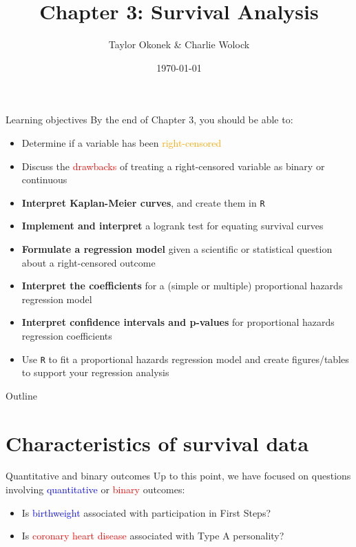 \documentclass[10pt,t]{beamer}
\title{Chapter 3: Survival Analysis}
\author{Taylor Okonek \& Charlie Wolock}
\date{\today}
\begin{document}
\begin{frame}
	\titlepage 
\end{frame}

\begin{frame}{Learning objectives}
	By the end of Chapter 3, you should be able to:
	
	\begin{itemize}
		\item Determine if a variable has been \textcolor{orange}{right-censored}
		\item Discuss the \textcolor{red}{drawbacks} of treating a right-censored variable as binary or continuous
		\item \textbf{Interpret Kaplan-Meier curves}, and create them in \texttt{R}
		\item \textbf{Implement and interpret} a logrank test for equating survival curves
		\item \textbf{Formulate a regression model} given a scientific or statistical question about a right-censored outcome
		\item \textbf{Interpret the coefficients} for a (simple or multiple) proportional hazards regression model
		\item \textbf{Interpret confidence intervals and p-values} for proportional hazards regression coefficients
		\item Use \texttt{R} to fit a proportional hazards regression model and create figures/tables to support your regression analysis
	\end{itemize}
	
\end{frame}

\begin{frame}{Outline}
	\tableofcontents
\end{frame}



\section{Characteristics of survival data}

\begin{frame}{Quantitative and binary outcomes}
Up to this point, we have focused on questions involving \textcolor{blue}{quantitative} or \textcolor{red}{binary} outcomes: 
\begin{itemize}
\item Is \textcolor{blue}{birthweight} associated with participation in First Steps?
\item Is \textcolor{red}{coronary heart disease} associated with Type A personality? 
\end{itemize}
\end{frame}
\end{document}
